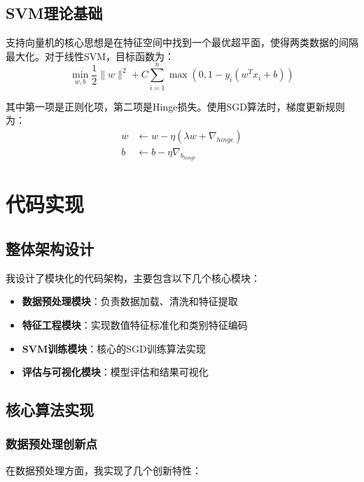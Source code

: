 \documentclass[a4paper]{article}
\begin{document}
\subsection{SVM理论基础}
支持向量机的核心思想是在特征空间中找到一个最优超平面，使得两类数据的间隔最大化。对于线性SVM，目标函数为：
\begin{equation}
\min_{w,b} \frac{1}{2}\|w\|^2 + C\sum_{i=1}^{n}\max(0, 1-y_i(w^Tx_i + b))
\end{equation}

其中第一项是正则化项，第二项是Hinge损失。使用SGD算法时，梯度更新规则为：
\begin{align}
w &\leftarrow w - \eta(\lambda w + \nabla_{hinge}) \\
b &\leftarrow b - \eta \nabla_{b_{hinge}}
\end{align}

\section{代码实现}

\subsection{整体架构设计}
我设计了模块化的代码架构，主要包含以下几个核心模块：

\begin{itemize}
    \item \textbf{数据预处理模块}：负责数据加载、清洗和特征提取
    \item \textbf{特征工程模块}：实现数值特征标准化和类别特征编码
    \item \textbf{SVM训练模块}：核心的SGD训练算法实现
    \item \textbf{评估与可视化模块}：模型评估和结果可视化
\end{itemize}

\subsection{核心算法实现}

\subsubsection{数据预处理创新点}
在数据预处理方面，我实现了几个创新特性：
\end{document}
